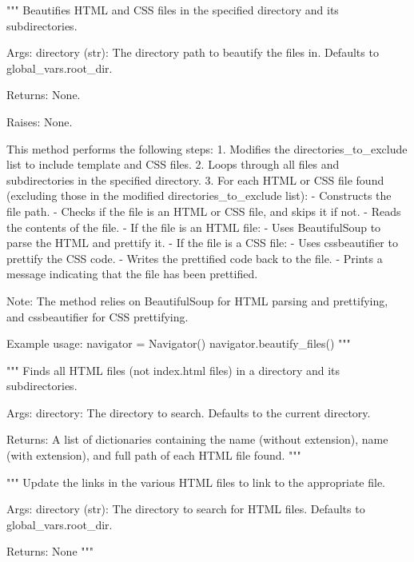 \begin{codebox}[MMORPDND.beautify\_files(self, directory=global\_vars.root\_dir)]
"""
Beautifies HTML and CSS files in the specified directory and its subdirectories.

Args:
	directory (str): The directory path to beautify the files in. Defaults to global_vars.root_dir.

Returns:
	None.

Raises:
	None.

This method performs the following steps:
	1. Modifies the directories_to_exclude list to include template and CSS files.
	2. Loops through all files and subdirectories in the specified directory.
	3. For each HTML or CSS file found (excluding those in the modified directories_to_exclude list):
		- Constructs the file path.
		- Checks if the file is an HTML or CSS file, and skips it if not.
		- Reads the contents of the file.
		- If the file is an HTML file:
		- Uses BeautifulSoup to parse the HTML and prettify it.
		- If the file is a CSS file:
		- Uses cssbeautifier to prettify the CSS code.
		- Writes the prettified code back to the file.
		- Prints a message indicating that the file has been prettified.

Note: 
	The method relies on BeautifulSoup for HTML parsing and prettifying, and cssbeautifier for CSS prettifying.

Example usage:
	navigator = Navigator()
	navigator.beautify_files()
"""
\end{codebox}


\begin{codebox}[MMORPDND.find\_all\_html\_files(self, directory=global\_vars.root\_dir)]
"""
Finds all HTML files (not index.html files) in a directory and its subdirectories.

Args:
	directory: The directory to search. Defaults to the current directory.
	
Returns: 
	A list of dictionaries containing the name (without extension), name (with extension), and full path
of each HTML file found.
"""
\end{codebox}


\begin{codebox}[MMORPDND.update\_html\_links(self, directory=global\_vars.root\_dir)]
"""
Update the links in the various HTML files to link to the appropriate file.

Args:
	directory (str): The directory to search for HTML files. Defaults to global_vars.root_dir.

Returns:
	None
"""
\end{codebox}

